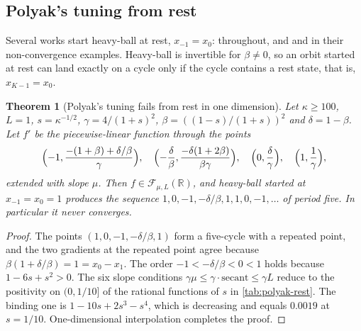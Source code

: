 \documentclass[11pt, a4paper]{article}
\newtheorem{theorem}{Theorem}
\theoremstyle{definition}
\newcommand{\R}{\mathbb{R}}
\newcommand{\F}{\mathcal{F}_{\mu,L}}
\begin{document}
\subsection{Polyak's tuning from rest}

Several works start heavy-ball at rest, $x_{-1}=x_0$: \citet{pasechniuk2026two} throughout, and
\citet[App.~B]{lessard2016analysis} and \citet[App.~H]{liu2026sharp} in their non-convergence examples.
Heavy-ball is invertible for $\beta\ne0$, so an orbit started at rest can land exactly on a cycle only if the cycle
contains a rest state, that is, $x_{K-1}=x_0$.

\begin{theorem}[Polyak's tuning fails from rest in one dimension]
  \label{thm:polyak-rest}
  Let $\kappa\ge100$, $L=1$, $s=\kappa^{-1/2}$, $\gamma=4/(1+s)^2$, $\beta=((1-s)/(1+s))^2$ and $\delta=1-\beta$. Let
  $f'$ be the piecewise-linear function through the points
  \[
    \Bigl(-1,\frac{-(1+\beta)+\delta/\beta}{\gamma}\Bigr),\quad
    \Bigl(-\frac\delta\beta,\frac{-\delta(1+2\beta)}{\beta\gamma}\Bigr),\quad
    \Bigl(0,\frac\delta\gamma\Bigr),\quad
    \Bigl(1,\frac1\gamma\Bigr),
  \]
  extended with slope $\mu$. Then $f\in\F(\R)$, and heavy-ball started at $x_{-1}=x_0=1$ produces the sequence
  $1,0,-1,-\delta/\beta,1,1,0,-1,\dots$ of period five. In particular it never converges.
\end{theorem}

\begin{proof}
  The points $(1,0,-1,-\delta/\beta,1)$ form a five-cycle with a repeated point, and the two gradients at the repeated
  point agree because $\beta(1+\delta/\beta)=1=x_0-x_1$. The order $-1<-\delta/\beta<0<1$ holds because
  $1-6s+s^2>0$. The six slope conditions $\gamma\mu\le\gamma\cdot\text{secant}\le\gamma L$ reduce to the positivity on
  $(0,1/10]$ of the rational functions of $s$ in \cref{tab:polyak-rest}. The binding one is $1-10s+2s^3-s^4$, which is
  decreasing and equals $0.0019$ at $s=1/10$. One-dimensional interpolation completes the proof.
\end{proof}
\end{document}
